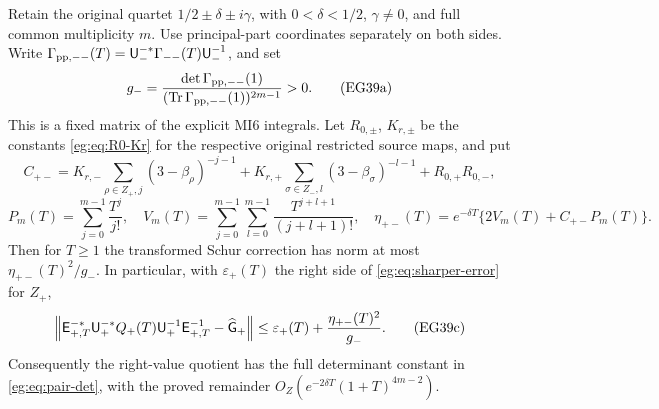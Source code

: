\begin{egproposition}
\label{eg:prop:quartet-bound}
Retain the original quartet $1/2\pm\delta\pm i\gamma$, with
$0<\delta<1/2$, $\gamma\ne0$, and full common multiplicity $m$.
Use principal-part coordinates separately on both sides. Write
$\Gamma_{\rm pp,--}(T)=\mathsf U_-^{-*}\Gamma_{--}(T)\mathsf U_-^{-1}$, and set
\[
 g_- =\frac{\det\Gamma_{\rm pp,--}(1)}
              {(\operatorname{Tr}\Gamma_{\rm pp,--}(1))^{2m-1}}>0.
 \tag{EG39a}\label{eg:eq:left-fixed-bound}
\]
This is a fixed matrix of the explicit MI6 integrals. Let $R_{0,\pm}$,
$K_{r,\pm}$ be the constants \eqref{eg:eq:R0-Kr} for the respective
original restricted source maps, and put
\[
 C_{+-}=K_{r,-}\sum_{\rho\in Z_+,j}(3-\beta_\rho)^{-j-1}
       +K_{r,+}\sum_{\sigma\in Z_-,l}(3-\beta_\sigma)^{-l-1}
       +R_{0,+}R_{0,-},
\]
\[
 P_m(T)=\sum_{j=0}^{m-1}\frac{T^j}{j!},\quad
 V_m(T)=\sum_{j=0}^{m-1}\sum_{l=0}^{m-1}
                          \frac{T^{j+l+1}}{(j+l+1)!},\quad
 \eta_{+-}(T)=e^{-\delta T}\{2V_m(T)+C_{+-}P_m(T)\}.
 \tag{EG39b}\label{eg:eq:cross-finite-bound}
\]
Then for $T\ge1$ the transformed Schur correction has norm at most
$\eta_{+-}(T)^2/g_-$. In particular, with $\varepsilon_+(T)$ the
right side of \eqref{eg:eq:sharper-error} for $Z_+$,
\[
 \left\|\mathsf E_{+,T}^{-*}\mathsf U_+^{-*}Q_+(T)\mathsf U_+^{-1}\mathsf E_{+,T}^{-1}
                    -\widehat{\mathsf G}_+\right\|
 \le\varepsilon_+(T)+\frac{\eta_{+-}(T)^2}{g_-}.
 \tag{EG39c}\label{eg:eq:quotient-finite-bound}
\]
Consequently the right-value quotient has the full determinant
constant in \eqref{eg:eq:pair-det}, with the proved remainder
$O_Z(e^{-2\delta T}(1+T)^{4m-2})$.
\end{egproposition}

